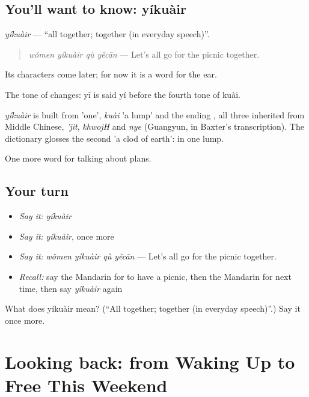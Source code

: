 \subsection*{You'll want to know: yíkuàir}
\emph{yíkuàir} — \textquotedblleft{}all together; together (in everyday speech)\textquotedblright{}.

\begin{quote}
\emph{wǒmen yíkuàir qù yěcān} — Let's all go for the picnic together.
\end{quote}

Its characters come later; for now it is a word for the ear.

The tone of  changes: yī is said yí before the fourth tone of kuài.

\begin{cousinweb}
\emph{yíkuàir} is built from  'one', \emph{kuài} 'a lump' and the ending , all three inherited from Middle Chinese, \emph{'jit}, \emph{khwojH} and \emph{nye} (Guangyun, in Baxter's transcription). The dictionary glosses the second 'a clod of earth': in one lump.
\end{cousinweb}

\begin{grammarlens}[title={What you've built}]
One more word for talking about plans.
\end{grammarlens}

\subsection*{Your turn}
\begin{itemize}
\raggedright
  \item \emph{Say it:} \emph{yíkuàir}
  \item \emph{Say it:} \emph{yíkuàir}, once more
  \item \emph{Say it:} \emph{wǒmen yíkuàir qù yěcān} — Let's all go for the picnic together.
  \item \emph{Recall:} say the Mandarin for to have a picnic, then the Mandarin for next time, then say \emph{yíkuàir} again
\end{itemize}

\begin{tcolorbox}[breakable,colback=teal!4,colframe=teal!35!black,title={Before you move on}]
What does yíkuàir mean? (\textquotedblleft{}All together; together (in everyday speech)\textquotedblright{}.) Say it once more.
\end{tcolorbox}
\section[(dialogue)]{Looking back: from Waking Up to Free This Weekend}

